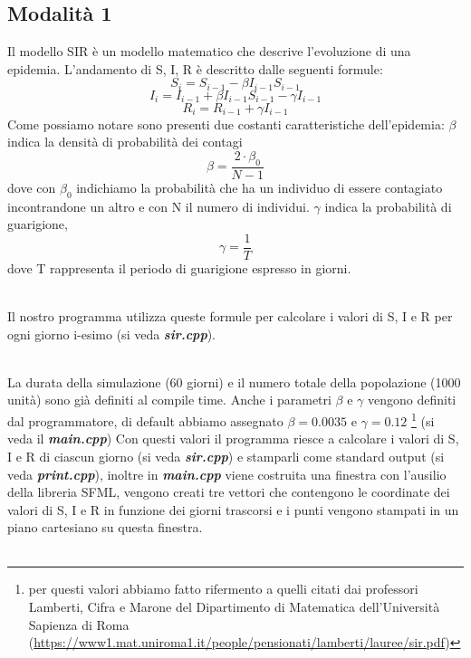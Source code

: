 \documentclass[a4paper,10 pt]{article}
\begin{document}
\subsection{Modalità 1}
Il modello SIR è un modello matematico che descrive l'evoluzione di una epidemia. L'andamento di S, I, R è descritto dalle seguenti formule:
\begin{equation}
  S_i = S_{i - 1} - \beta I_{i - 1}S_{i - 1} 
\end{equation}
\begin{equation}
  I_i = I_{i - 1} + \beta I_{i - 1}S_{i - 1} - \gamma I_{i - 1}
\end{equation}
\begin{equation}
  R_i = R_{i - 1} + \gamma I_{i - 1}
\end{equation} Come possiamo notare sono presenti due costanti caratteristiche dell'epidemia: $\beta$ indica la densità di probabilità dei contagi 
\begin{equation}
  \beta = \frac{2\cdot \beta_0}{N-1}
\end{equation}
dove con $\beta_0$ indichiamo la probabilità che ha un individuo di essere contagiato incontrandone un altro e con N il numero di individui. 
$\gamma$ indica la probabilità di guarigione, 
\begin{equation}
  \gamma = \frac{1}{T}
\end{equation} dove T rappresenta il periodo di guarigione espresso in giorni.

\ 
\\
Il nostro programma utilizza queste formule per calcolare i valori di S, I e R per ogni giorno i-esimo (si veda  \textbf{\textit{sir.cpp}}).

\ 
\\
La durata della simulazione (60 giorni) e il numero totale della popolazione (1000 unità) sono già definiti al compile time. Anche i parametri $\beta$ e $\gamma$ vengono definiti dal programmatore, di default abbiamo assegnato $\beta = 0.0035$ e $\gamma = 0.12$ \footnote{per questi valori abbiamo fatto rifermento a quelli citati dai professori Lamberti, Cifra e Marone del Dipartimento di Matematica dell'Università Sapienza di Roma (\url{https://www1.mat.uniroma1.it/people/pensionati/lamberti/lauree/sir.pdf})} (si veda il \textbf{\textit{main.cpp}})
Con questi valori il programma riesce a calcolare i valori di S, I e R di ciascun giorno (si veda  \textbf{\textit{sir.cpp}}) e stamparli come standard output (si veda  \textbf{\textit{print.cpp}}), inoltre in \textbf{\textit{main.cpp}} viene costruita una finestra con l'ausilio della libreria SFML, vengono creati tre vettori che contengono le coordinate dei valori di S, I e R in funzione dei giorni trascorsi e i punti vengono stampati in un piano cartesiano su questa finestra.
\
\\
\\
\end{document}
